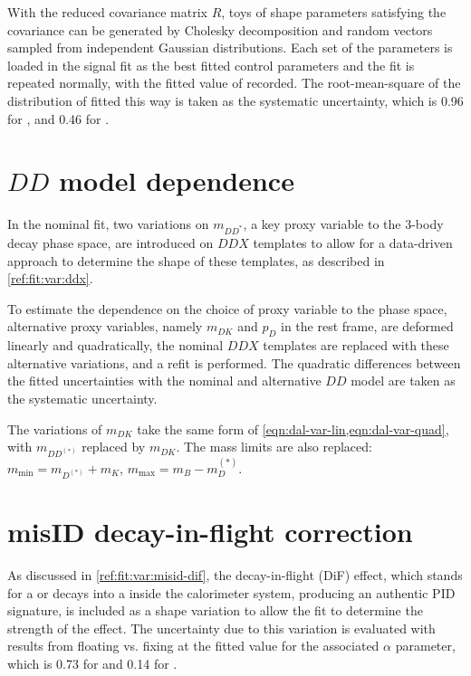 With the reduced covariance matrix $R$, toys of shape parameters satisfying
the covariance can be generated by Cholesky decomposition and random vectors
sampled from independent Gaussian distributions.
Each set of the parameters is loaded in the signal fit as the best
fitted control parameters and the fit is repeated normally,
with the fitted value of \RDX recorded.
The root-mean-square of the distribution of \RDX fitted this way is taken as
the systematic uncertainty,
which is 0.96 for \RD, and 0.46 for \RDst.



\section{$DD$ model dependence}
\label{sys-model-ddx}

In the nominal fit, two variations on $m_{DD^{*}}$,
a key proxy variable to the 3-body decay phase space,
are introduced on $DDX$ templates to allow for a data-driven approach to
determine the shape of these templates, as described in
\cref{ref:fit:var:ddx}.

To estimate the dependence on the choice of proxy variable to the phase space,
alternative proxy variables, namely $m_{DK}$ and $p_D$ in the \B rest frame,
are deformed linearly and quadratically,
the nominal $DDX$ templates are replaced with these alternative variations,
and a refit is performed.
The quadratic differences between the fitted uncertainties with the nominal and
alternative $DD$ model are taken as the systematic uncertainty.

The variations of $m_{DK}$ take the same form of
\cref{eqn:dal-var-lin,eqn:dal-var-quad}, with $m_{DD^{(*)}}$ replaced by
$m_{DK}$.
The mass limits are also replaced:
$m_\text{min} = m_{D^{(*)}} + m_K$, $m_\text{max} = m_B - m_D^{(*)}$.


\section{\muon misID decay-in-flight correction}
\label{sys-model-dif}

As discussed in \cref{ref:fit:var:misid-dif},
the decay-in-flight (DiF) effect,
which stands for a \kaon or \pion decays into a \muon inside the calorimeter
system, producing an authentic \muon PID signature,
is included as a shape variation to allow the fit to determine
the strength of the effect.
The uncertainty due to this variation is evaluated with results
from floating vs. fixing at the fitted value for the associated $\alpha$
parameter,
which is 0.73 for \RD and 0.14 for \RDst.


